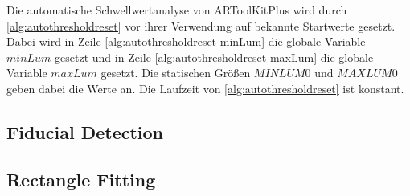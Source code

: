 Die automatische Schwellwertanalyse von ARToolKitPlus wird durch \autoref{alg:autothresholdreset} vor ihrer Verwendung
 auf bekannte Startwerte gesetzt. Dabei wird in Zeile \ref{alg:autothresholdreset-minLum} die globale Variable
 $\mathit{minLum}$ gesetzt und in Zeile \ref{alg:autothresholdreset-maxLum} die globale Variable $\mathit{maxLum}$
 gesetzt. Die statischen Größen $\mathit{MINLUM0}$ und $\mathit{MAXLUM0}$ geben dabei die Werte an. Die Laufzeit von
 \autoref{alg:autothresholdreset} ist konstant.







\subsection{Fiducial Detection} %
\label{sec:fiducial_detection}


\clearpage

\subsection{Rectangle Fitting} %
\label{sec:rectangle_fitting}


